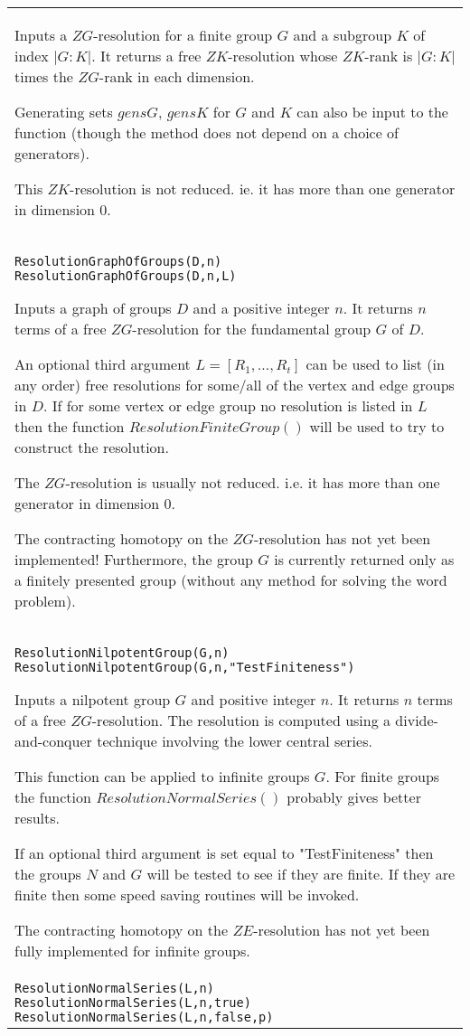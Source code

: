 \documentclass[a4paper,11pt]{report}
\begin{document}
{\begin{center}
\begin{tabular}{|l|}
 Inputs a $ZG$-resolution for a finite group $G$ and a subgroup $K$ of index $|G:K|$. It returns a free $ZK$-resolution whose $ZK$-rank is $|G:K|$ times the $ZG$-rank in each dimension.

 Generating sets $gensG$, $gensK$ for $G$ and $K$ can also be input to the function (though the method does not depend on a
choice of generators).

 This $ZK$-resolution is not reduced. ie. it has more than one generator in dimension $0$. \\
 \index{ResolutionGraphOfGroups} \texttt{ResolutionGraphOfGroups(D,n) } \texttt{ResolutionGraphOfGroups(D,n,L) } 

 Inputs a graph of groups $D$ and a positive integer $n$. It returns $n$ terms of a free $ZG$-resolution for the fundamental group $G$ of $D$.

 An optional third argument $L=[R_1 , \ldots , R_t]$ can be used to list (in any order) free resolutions for some/all of the vertex
and edge groups in $D$. If for some vertex or edge group no resolution is listed in $L$ then the function $ResolutionFiniteGroup()$ will be used to try to construct the resolution. 

 The $ZG$-resolution is usually not reduced. i.e. it has more than one generator in
dimension 0.

 The contracting homotopy on the $ZG$-resolution has not yet been implemented! Furthermore, the group $G$ is currently returned only as a finitely presented group (without any method
for solving the word problem). \\
 \index{ResolutionNilpotentGroup} \texttt{ResolutionNilpotentGroup(G,n) } \texttt{ResolutionNilpotentGroup(G,n,"TestFiniteness")} 

 Inputs a nilpotent group $G$ and positive integer $n$. It returns $n$ terms of a free $ZG$-resolution. The resolution is computed using a divide-and-conquer technique
involving the lower central series.

 This function can be applied to infinite groups $G$. For finite groups the function $ResolutionNormalSeries()$ probably gives better results.

 If an optional third argument is set equal to "TestFiniteness" then the groups $N$ and $G$ will be tested to see if they are finite. If they are finite then some speed
saving routines will be invoked.

 The contracting homotopy on the $ZE$-resolution has not yet been fully implemented for infinite groups. \\
 \index{ResolutionNormalSeries} \texttt{ResolutionNormalSeries(L,n) } \texttt{ResolutionNormalSeries(L,n,true)} \texttt{ResolutionNormalSeries(L,n,false,p)} 


\end{tabular}
\end{center}}
\end{document}
